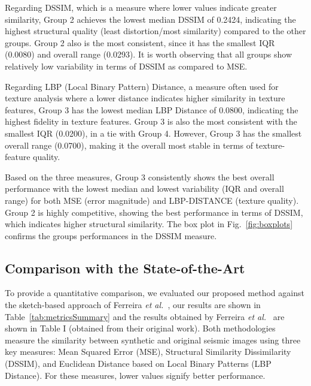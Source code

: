 \documentclass{ieeeaccess}
\begin{document}
Regarding DSSIM, which is a measure where lower values indicate greater similarity, Group 2 achieves the lowest median DSSIM of 0.2424, indicating the highest structural quality (least distortion/most similarity) compared to the other groups. Group 2 also is the most consistent, since it has the smallest IQR (0.0080) and overall range (0.0293). It is worth observing that all groups show relatively low variability in terms of DSSIM as compared to MSE.

Regarding LBP (Local Binary Pattern) Distance, a measure often used for texture analysis where a lower distance indicates higher similarity in texture features, Group 3 has the lowest median LBP Distance of 0.0800, indicating the highest fidelity in texture features. Group 3 is also the most consistent with the smallest IQR (0.0200), in a tie with Group 4. However, Group 3 has the smallest overall range (0.0700), making it the overall most stable in terms of texture-feature quality.

Based on the three measures, Group 3 consistently shows the best overall performance with the lowest median and lowest variability (IQR and overall range) for both MSE (error magnitude) and LBP-DISTANCE (texture quality). Group 2 is highly competitive, showing the best performance in terms of DSSIM, which indicates higher structural similarity. The box plot in Fig.~\ref{fig:boxplots} confirms the groups performances in the DSSIM measure.


\subsection{Comparison with the State-of-the-Art}

To provide a quantitative comparison, we evaluated our proposed method against the sketch-based approach of Ferreira \emph{et al.}~\cite{Ferreira2020}, our results are shown in Table~\ref{tab:metricsSummary} and the results obtained by Ferreira \emph{et al.}~\cite{Ferreira2020} are shown in Table I (obtained from their original work). Both methodologies measure the similarity between synthetic and original seismic images using three key measures: Mean Squared Error (MSE), Structural Similarity Dissimilarity (DSSIM), and Euclidean Distance based on Local Binary Patterns (LBP Distance). For these measures, lower values signify better performance.
\end{document}
